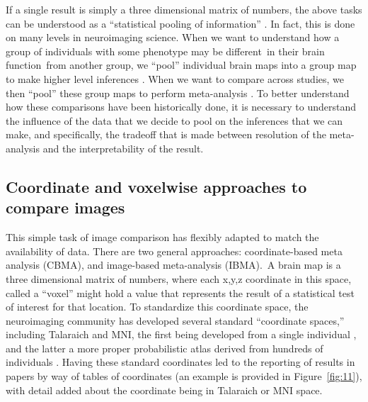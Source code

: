 \documentclass{report}
\begin{document}
If a single result is simply a three dimensional matrix of numbers, the
above tasks can be understood as a ``statistical pooling of
information'' \cite{Lazar2002-dk}.
In fact, this is done on many levels in neuroimaging science. When we
want to understand how a group of individuals with some phenotype may be
different~in their brain function~from another group, we ``pool''
individual brain maps into a group map to make higher level inferences \cite{Smith2004-lw}.
When we want to compare across studies, we then ``pool'' these group
maps to perform meta-analysis \cite{Costafreda2009-ys}.
To better understand how these comparisons have been historically done,
it is necessary to understand the influence of the data that we decide
to pool on the inferences that we can make, and specifically, the
tradeoff that is made between resolution of the meta-analysis and the
interpretability of the result.

\subsection{Coordinate and voxelwise approaches to compare images}

This simple task of image comparison has flexibly adapted to match the
availability of data. There are two general approaches: coordinate-based
meta analysis (CBMA), and image-based meta-analysis (IBMA).~A brain map
is a three dimensional matrix of numbers, where each x,y,z coordinate in
this space, called a ``voxel'' might hold a value that represents the
result of a statistical test of interest for that location. To
standardize this coordinate space, the neuroimaging community has
developed several standard ``coordinate spaces,'' including Talaraich
and MNI, the first being developed from a single individual \cite{Talairach1988-os},
and the latter a more proper probabilistic atlas derived from hundreds
of individuals \cite{Mazziotta1995-gn,Brett2001-gk}.
Having these standard coordinates led to the reporting of results in
papers by way of tables of coordinates (an example is provided in Figure~\ref{fig:11}), with detail added about the coordinate being in Talaraich or MNI
space.
\end{document}

